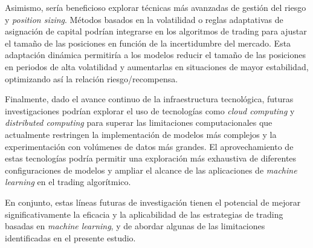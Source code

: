 \documentclass[a4paper,12pt, twoside]{report}
\begin{document}
Asimismo, sería beneficioso explorar técnicas más avanzadas de gestión del riesgo y \textit{position sizing}. 
Métodos basados en la volatilidad o reglas adaptativas de asignación de capital podrían integrarse en los 
algoritmos de trading para ajustar el tamaño de las posiciones en función de la incertidumbre del mercado. 
Esta adaptación dinámica permitiría a los modelos reducir el tamaño de las posiciones en periodos de 
alta volatilidad y aumentarlas en situaciones de mayor estabilidad, optimizando así la relación riesgo/recompensa.


Finalmente, dado el avance continuo de la infraestructura tecnológica, futuras 
investigaciones podrían explorar el uso de tecnologías como \textit{cloud computing} 
y \textit{distributed computing} para superar las limitaciones computacionales que 
actualmente restringen la implementación de modelos más complejos y la experimentación 
con volúmenes de datos más grandes. El aprovechamiento de estas tecnologías podría 
permitir una exploración más exhaustiva de diferentes configuraciones de modelos y 
ampliar el alcance de las aplicaciones de \textit{machine learning} en el trading algorítmico.

En conjunto, estas líneas futuras de investigación tienen el potencial de mejorar 
significativamente la eficacia y la aplicabilidad de las estrategias de trading basadas 
en \textit{machine learning}, y de abordar algunas de las limitaciones identificadas 
en el presente estudio.



\end{document}
